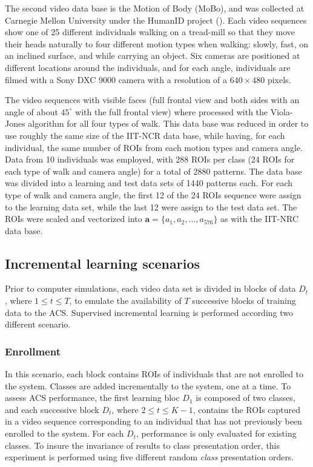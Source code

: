 The second video data base is the Motion of Body (MoBo), and was collected at Carnegie Mellon University under the HumanID project (\cite{gross02}). Each video sequences show one of 25 different individuals walking on a tread-mill so that they move their heads naturally to four different motion types when walking: slowly, fast, on an inclined surface, and while carrying an object. Six cameras are positioned at different locations around the individuals, and for each angle, individuals are filmed with a Sony DXC 9000 camera with a resolution of a $640\times480$ pixels.

The video sequences with visible faces (full frontal view and both sides with an angle of about $45^\circ$ with the full frontal view) where processed with the Viola-Jones algorithm for all four types of walk. This data base was reduced in order to use roughly the same size of the IIT-NCR data base, while having, for each individual, the same number of ROIs from each motion types and camera angle. Data from 10 individuals was employed, with 288 ROIs per class (24 ROIs for each type of walk and camera angle) for a total of 2880 patterns. The data base was divided into a learning and test data sets of 1440 patterns each. For each type of walk and camera angle, the first 12 of the 24 ROIs sequence were assign to the learning data set, while the last 12 were assign to the test data set. The ROIs were scaled and vectorized into $\textbf{a} = \{ a_1, a_2, ... , a_{576}\}$ as with the IIT-NRC data base.

\subsection{Incremental learning scenarios}
\label{sec:c1_scenario}

Prior to computer simulations, each video data set is divided in blocks of data $D_t$, where $1\leq t\leq T$, to emulate the availability of $T$ successive blocks of training data to the ACS. Supervised incremental learning is performed according two different scenario.

\subsubsection{Enrollment}

In this scenario, each block contains ROIs of individuals that are not enrolled to the system. Classes are added incrementally to the system, one at a time. To assess ACS performance, the first learning bloc $D_1$ is composed of two classes, and each successive block $D_t$, where $2 \leq t \leq K-1$, contains the ROIs captured in a video sequence corresponding to an individual that has not previously been enrolled to the system. For each $D_t$, performance is only evaluated for existing classes. To insure the invariance of results to class presentation order, this experiment is performed using five different random \emph{class} presentation orders.

